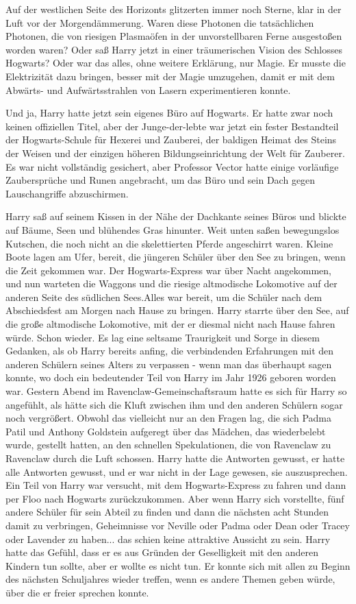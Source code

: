 Auf der westlichen Seite des Horizonts glitzerten immer noch Sterne, klar in der
Luft vor der Morgendämmerung. Waren diese Photonen die tatsächlichen Photonen,
die von riesigen Plasmaöfen in der unvorstellbaren Ferne ausgestoßen worden
waren? Oder saß Harry jetzt in einer träumerischen Vision des Schlosses
Hogwarts? Oder war das alles, ohne weitere Erklärung, \glqq{}nur Magie\grqq{}. Er
musste die Elektrizität dazu bringen, besser mit der Magie umzugehen, damit er
mit dem Abwärts- und Aufwärtsstrahlen von Lasern experimentieren konnte.

Und ja, Harry hatte jetzt sein eigenes Büro auf Hogwarts. Er hatte zwar noch
keinen offiziellen Titel, aber der Junge-der-lebte war jetzt ein fester
Bestandteil der Hogwarts-Schule für Hexerei und Zauberei, der baldigen Heimat
des Steins der Weisen und der einzigen höheren Bildungseinrichtung der Welt für
Zauberer. Es war nicht vollständig gesichert, aber Professor Vector hatte einige
vorläufige Zaubersprüche und Runen angebracht, um das Büro und sein Dach gegen
Lauschangriffe abzuschirmen.

Harry saß auf seinem Kissen in der Nähe der Dachkante seines Büros und blickte
auf Bäume, Seen und blühendes Gras hinunter. Weit unten saßen bewegungslos
Kutschen, die noch nicht an die skelettierten Pferde angeschirrt waren. Kleine
Boote lagen am Ufer, bereit, die jüngeren Schüler über den See zu bringen, wenn
die Zeit gekommen war. Der Hogwarts-Express war über Nacht angekommen, und nun
warteten die Waggons und die riesige altmodische Lokomotive auf der anderen
Seite des südlichen Sees.Alles war bereit, um die Schüler nach dem Abschiedsfest
am Morgen nach Hause zu bringen. Harry starrte über den See, auf die große
altmodische Lokomotive, mit der er diesmal nicht nach Hause fahren würde. Schon
wieder. Es lag eine seltsame Traurigkeit und Sorge in diesem Gedanken, als ob
Harry bereits anfing, die verbindenden Erfahrungen mit den anderen Schülern
seines Alters zu verpassen - wenn man das überhaupt sagen konnte, wo doch ein
bedeutender Teil von Harry im Jahr 1926 geboren worden war. Gestern Abend im
Ravenclaw-Gemeinschaftsraum hatte es sich für Harry so angefühlt, als hätte sich
die Kluft zwischen ihm und den anderen Schülern sogar noch vergrößert. Obwohl
das vielleicht nur an den Fragen lag, die sich Padma Patil und Anthony Goldstein
aufgeregt über das Mädchen, das wiederbelebt wurde, gestellt hatten, an den
schnellen Spekulationen, die von Ravenclaw zu Ravenclaw durch die Luft schossen.
Harry hatte die Antworten gewusst, er hatte alle Antworten gewusst, und er war
nicht in der Lage gewesen, sie auszusprechen. Ein Teil von Harry war versucht,
mit dem Hogwarts-Express zu fahren und dann per Floo nach Hogwarts
zurückzukommen. Aber wenn Harry sich vorstellte, fünf andere Schüler für sein
Abteil zu finden und dann die nächsten acht Stunden damit zu verbringen,
Geheimnisse vor Neville oder Padma oder Dean oder Tracey oder Lavender zu
haben... das schien keine attraktive Aussicht zu sein. Harry hatte das Gefühl,
dass er es aus Gründen der Geselligkeit mit den anderen Kindern tun sollte, aber
er wollte es nicht tun. Er konnte sich mit allen zu Beginn des nächsten
Schuljahres wieder treffen, wenn es andere Themen geben würde, über die er
freier sprechen konnte.

